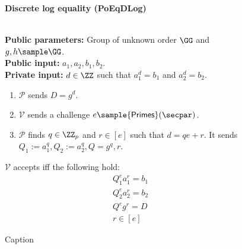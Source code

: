 \begin{figure}
    \centering
    \begin{mdframed}
    \begin{center}
        \textbf{Discrete log equality ({\sf PoEqDLog})~\cite{cryptoeprint:2020/1617}}
    \end{center}
    \hfill\\
    \textbf{Public parameters:} Group of unknown order $\GG$ and $g,h\sample\GG$.\hfill\\
    \textbf{Public input:} $a_1, a_2, b_1, b_2$.\hfill\\
    \textbf{Private input:} $d \in \ZZ$ such that $a_1^d = b_1$ and $a_2^d = b_2$.
    \begin{enumerate}
        \item $\mathcal{P}$ sends $D = g^d$.
        \item $\mathcal{V}$ sends a challenge $e \sample {\sf Primes}(\secpar)$.
        \item $\mathcal{P}$ finds $q \in \ZZ_p$ and $r \in [e]$ such that $d = qe + r$. It sends $Q_1 := a_1^q, Q_2 := a_2^q, Q = g^q, r$.
    \end{enumerate}
    $\mathcal{V}$ accepts iff the following hold:
    \begin{align*}
        Q_1^e a_1^r = b_1\\
        Q_2^e a_2^r = b_2\\
        Q^e g^r = D\\
        r \in [e]
    \end{align*}
    \end{mdframed}
    \caption{Caption}
    \label{fig:podleq}
\end{figure}